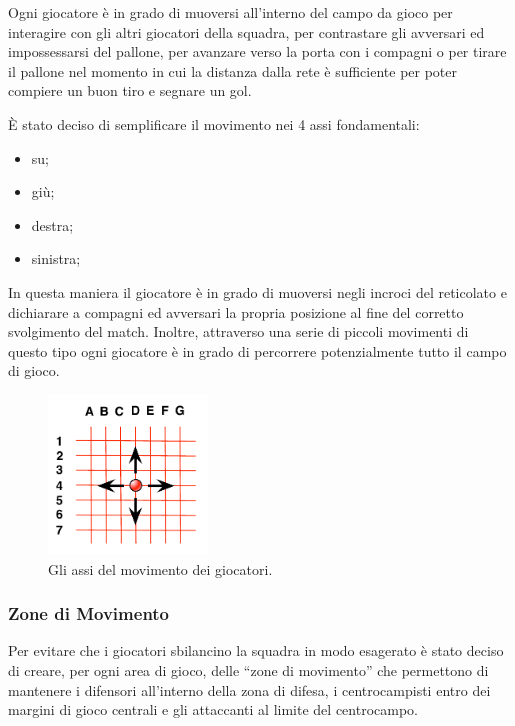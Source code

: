 \documentclass[aps,letterpaper,10pt]{article}
\begin{document}
Ogni giocatore \`e in grado di muoversi all'interno del campo da gioco per interagire con gli altri giocatori della
squadra, per contrastare gli avversari ed impossessarsi del pallone, per avanzare verso la porta con i compagni o per
tirare il pallone nel momento in cui la distanza dalla rete \`e sufficiente per poter compiere un buon tiro e segnare un
gol. \vspace{3mm}

\`E stato deciso di semplificare il movimento nei 4 assi fondamentali:

\begin{itemize}
	\item su;
	\item gi\`u;
	\item destra;
	\item sinistra;
\end{itemize}

In questa maniera il giocatore \`e in grado di muoversi negli incroci del reticolato e dichiarare a compagni ed
avversari la propria posizione al fine del corretto svolgimento del match. Inoltre, attraverso una serie di piccoli
movimenti di questo tipo ogni giocatore \`e in grado di percorrere potenzialmente tutto il campo di gioco.

\begin{figure}[H]
	\begin{center}
		\includegraphics[width=160px]{images/movement.pdf}
	\end{center}
\caption{Gli assi del movimento dei giocatori.}
\end{figure}

\subsubsection{Zone di Movimento}
\label{zone}

Per evitare che i giocatori sbilancino la squadra in modo esagerato \`e stato deciso di creare, per ogni area di gioco,
delle ``zone di movimento'' che permettono di mantenere i difensori all'interno della zona di difesa, i centrocampisti
entro dei margini di gioco centrali e gli attaccanti al limite del centrocampo. \vspace{3mm}
\end{document}
